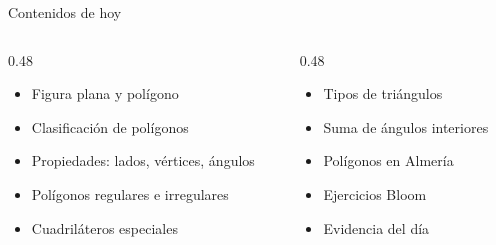 \documentclass[aspectratio=169, 10pt, spanish]{beamer}
\begin{document}
\begin{frame}[plain]
  \titlepage
\end{frame}

\begin{frame}{Contenidos de hoy}
  \begin{columns}[t]
    \begin{column}{0.48\textwidth}
      \begin{itemize}
        \item Figura plana y polígono
        \item Clasificación de polígonos
        \item Propiedades: lados, vértices, ángulos
        \item Polígonos regulares e irregulares
        \item Cuadriláteros especiales
      \end{itemize}
    \end{column}
    \begin{column}{0.48\textwidth}
      \begin{itemize}
        \item Tipos de triángulos
        \item Suma de ángulos interiores
        \item Polígonos en Almería
        \item Ejercicios Bloom
        \item Evidencia del día
      \end{itemize}
    \end{column}
  \end{columns}
  \vspace{0.4cm}
  \begin{notabox}
    \quad
    \quad
    \quad
  \end{notabox}
\end{frame}

\end{document}
